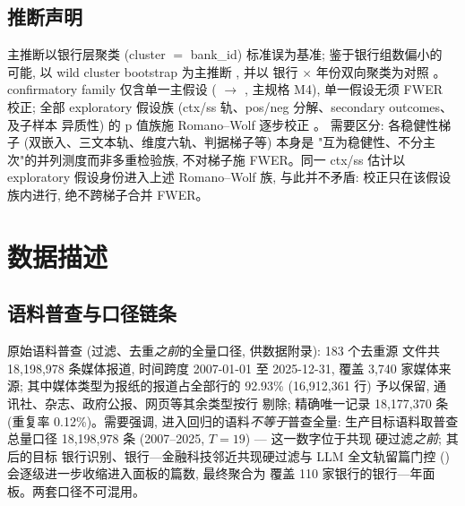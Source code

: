 \subsection{推断声明}\label{sec:method:infer}
主推断以银行层聚类 (cluster $=$ bank\_id) 标准误为基准; 鉴于银行组数偏小的
可能, 以 wild cluster bootstrap 为主推断
\parencite{roodman2019boottest,mackinnon2017wild,cameron2008bootstrap}, 并以
银行 $\times$ 年份双向聚类为对照 \parencite{cameron2015practitioner}。
confirmatory family 仅含单一主假设 ( $\to$
, 主规格 M4), 单一假设无须 FWER 校正; 全部 exploratory 假设族
(ctx/ss 轨、pos/neg 分解、secondary outcomes、 及子样本
异质性) 的 p 值族施 Romano--Wolf 逐步校正 \parencite{romano2005stepwise}。
需要区分: 各稳健性梯子 (双嵌入、三文本轨、维度六轨、判据梯子等) 本身是
"互为稳健性、不分主次"的并列测度而非多重检验族, 不对梯子施 FWER。同一
ctx/ss 估计以 exploratory 假设身份进入上述 Romano--Wolf 族, 与此并不矛盾:
校正只在该假设族内进行, 绝不跨梯子合并 FWER。

\section{数据描述}\label{sec:data}

\subsection{语料普查与口径链条}
原始语料普查 (过滤、去重\emph{之前}的全量口径, 供数据附录): 183 个去重源
文件共 18{,}198{,}978 条媒体报道, 时间跨度 2007-01-01 至 2025-12-31, 覆盖
3{,}740 家媒体来源; 其中媒体类型为报纸的报道占全部行的 92.93\%
(16{,}912{,}361 行) 予以保留, 通讯社、杂志、政府公报、网页等其余类型按行
剔除; 精确唯一记录 18{,}177{,}370 条 (重复率 0.12\%)。需要强调, 进入回归的语料\emph{不等于}普查全量: 生产目标语料取普查
总量口径 18{,}198{,}978 条 (2007--2025, $T=19$) --- 这一数字位于共现
硬过滤\emph{之前}; 其后的目标
银行识别、银行—金融科技邻近共现硬过滤与 LLM 全文轨留篇门控
() 会逐级进一步收缩进入面板的篇数, 最终聚合为
覆盖 110 家银行的银行—年面板。两套口径不可混用。

